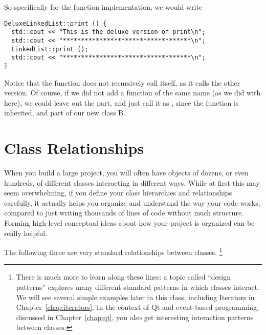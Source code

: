 So specifically for the  function implementation, we would
write
\begin{verbatim}
DeluxeLinkedList::print () {
  std::cout << "This is the deluxe version of print\n";
  std::cout << "***********************************\n";
  LinkedList::print ();
  std::cout << "***********************************\n";
}
\end{verbatim}
Notice that the  function does not recursively call
itself, as it calls the other version.
Of course, if we did not add a function of the same name
(as we did with  here),
we could leave out the  part,
and just call it as ,
since the function is inherited, and part of our new class B.

\section{Class Relationships}
When you build a large project, you will often have objects of dozens,
or even hundreds, of different classes interacting in different ways.
While at first this may seem overwhelming, if you define your class
hierarchies and relationships carefully,
it actually helps you organize and understand the way your code works,
compared to just writing thousands of lines of code without much structure.
Forming high-level conceptual ideas about how your project is
organized can be really helpful.

The following three are very standard relationships between classes.%
\footnote{There is much more to learn along these lines:
  a topic called ``design patterns'' explores many different standard
  patterns in which classes interact.
  We will see several simple examples later in this class,
  including Iterators in Chapter~\ref{chap:iterators}.
  In the context of Qt and event-based programming, discussed in
  Chapter~\ref{chap:qt}, you also get interesting interaction patterns
  between classes.}

